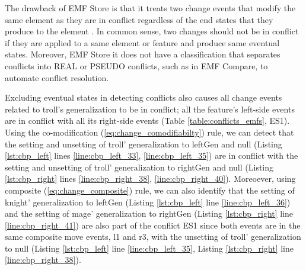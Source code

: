 The drawback of EMF Store is that it treats two change events that modify the same element as they are in conflict regardless of the end states that they produce to the element \cite{DBLP:conf/sfm/BroschKLSWW12}. In common sense, two changes should not be in conflict if they are applied to a same element or feature and produce same eventual states. Moreover, EMF Store it does not have a classification that separates conflicts into \textsf{REAL} or \textsf{PSEUDO} conflicts, such as in EMF Compare, to automate conflict resolution. 


Excluding eventual states in detecting conflicts also causes all change events related to \textsf{troll}'s \textsf{generalization} to be in conflict; all the feature's left-side events are in conflict with all its right-side events (Table \ref{table:conflicts_emfs}, ES1). Using the co-modification  (\ref{eq:change_comodifiabilty}) rule, we can detect that the setting and unsetting of \textsf{troll}' \textsf{generalization} to \textsf{leftGen} and \textsf{null} (Listing \ref{lst:cbp_left} lines \ref{line:cbp_left_33}, \ref{line:cbp_left_35}) are in conflict with the setting and unsetting of \textsf{troll}' \textsf{generalization} to \textsf{rightGen} and \textsf{null} (Listing \ref{lst:cbp_right} lines \ref{line:cbp_right_38}, \ref{line:cbp_right_40}). Moreoever, using composite (\ref{eq:change_composite}) rule, we can also identify that the setting of \textsf{knight}' \textsf{generalization} to \textsf{leftGen} (Listing \ref{lst:cbp_left} line \ref{line:cbp_left_36}) and the setting of \textsf{mage}' \textsf{generalization} to \textsf{rightGen} (Listing \ref{lst:cbp_right} line \ref{line:cbp_right_41}) are also part of the conflict ES1 since both events are in the same composite move events, \textsf{l1} and \textsf{r3}, with the unsetting of \textsf{troll}' \textsf{generalization} to  \textsf{null} (Listing \ref{lst:cbp_left} line \ref{line:cbp_left_35}, Listing \ref{lst:cbp_right} line \ref{line:cbp_right_38}).

